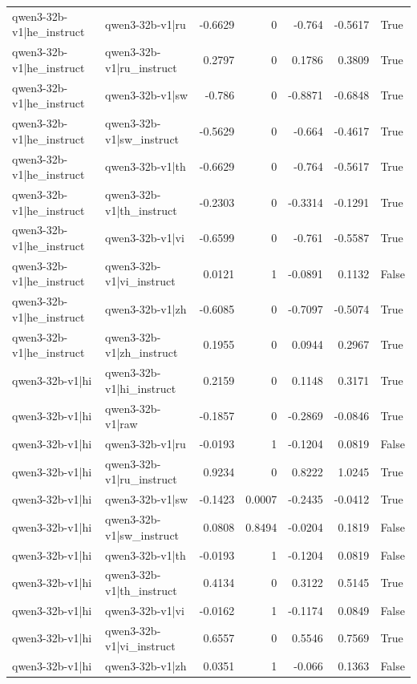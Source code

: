 \begin{table}
\begin{tabular}{l l r r r r l}
qwen3-32b-v1|he_instruct & qwen3-32b-v1|ru & -0.6629 & 0 & -0.764 & -0.5617 & True \\
qwen3-32b-v1|he_instruct & qwen3-32b-v1|ru_instruct & 0.2797 & 0 & 0.1786 & 0.3809 & True \\
qwen3-32b-v1|he_instruct & qwen3-32b-v1|sw & -0.786 & 0 & -0.8871 & -0.6848 & True \\
qwen3-32b-v1|he_instruct & qwen3-32b-v1|sw_instruct & -0.5629 & 0 & -0.664 & -0.4617 & True \\
qwen3-32b-v1|he_instruct & qwen3-32b-v1|th & -0.6629 & 0 & -0.764 & -0.5617 & True \\
qwen3-32b-v1|he_instruct & qwen3-32b-v1|th_instruct & -0.2303 & 0 & -0.3314 & -0.1291 & True \\
qwen3-32b-v1|he_instruct & qwen3-32b-v1|vi & -0.6599 & 0 & -0.761 & -0.5587 & True \\
qwen3-32b-v1|he_instruct & qwen3-32b-v1|vi_instruct & 0.0121 & 1 & -0.0891 & 0.1132 & False \\
qwen3-32b-v1|he_instruct & qwen3-32b-v1|zh & -0.6085 & 0 & -0.7097 & -0.5074 & True \\
qwen3-32b-v1|he_instruct & qwen3-32b-v1|zh_instruct & 0.1955 & 0 & 0.0944 & 0.2967 & True \\
qwen3-32b-v1|hi & qwen3-32b-v1|hi_instruct & 0.2159 & 0 & 0.1148 & 0.3171 & True \\
qwen3-32b-v1|hi & qwen3-32b-v1|raw & -0.1857 & 0 & -0.2869 & -0.0846 & True \\
qwen3-32b-v1|hi & qwen3-32b-v1|ru & -0.0193 & 1 & -0.1204 & 0.0819 & False \\
qwen3-32b-v1|hi & qwen3-32b-v1|ru_instruct & 0.9234 & 0 & 0.8222 & 1.0245 & True \\
qwen3-32b-v1|hi & qwen3-32b-v1|sw & -0.1423 & 0.0007 & -0.2435 & -0.0412 & True \\
qwen3-32b-v1|hi & qwen3-32b-v1|sw_instruct & 0.0808 & 0.8494 & -0.0204 & 0.1819 & False \\
qwen3-32b-v1|hi & qwen3-32b-v1|th & -0.0193 & 1 & -0.1204 & 0.0819 & False \\
qwen3-32b-v1|hi & qwen3-32b-v1|th_instruct & 0.4134 & 0 & 0.3122 & 0.5145 & True \\
qwen3-32b-v1|hi & qwen3-32b-v1|vi & -0.0162 & 1 & -0.1174 & 0.0849 & False \\
qwen3-32b-v1|hi & qwen3-32b-v1|vi_instruct & 0.6557 & 0 & 0.5546 & 0.7569 & True \\
qwen3-32b-v1|hi & qwen3-32b-v1|zh & 0.0351 & 1 & -0.066 & 0.1363 & False \\

\end{tabular}
\end{table}
